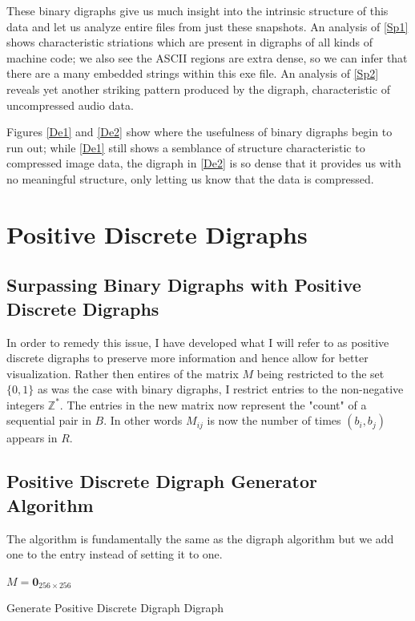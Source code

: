 \documentclass[12pt,a4paper]{article}
\begin{document}
These binary digraphs give us much insight into the intrinsic structure of this data and let us analyze entire files from just these snapshots. An analysis of \ref{Sp1} shows characteristic striations which are present in digraphs of all kinds of machine code; we also see the ASCII regions are extra dense, so we can infer that there are a many embedded strings within this exe file. An analysis of \ref{Sp2} reveals yet another striking pattern produced by the digraph, characteristic of uncompressed audio data. 

Figures \ref{De1} and \ref{De2} show where the usefulness of binary digraphs begin to run out; while \ref{De1} still shows a semblance of structure characteristic to compressed image data, the digraph in \ref{De2} is so dense that it provides us with no meaningful structure, only letting us know that the data is compressed. 

\section{Positive Discrete Digraphs}
\subsection{Surpassing Binary Digraphs with Positive Discrete Digraphs}
In order to remedy this issue, I have developed what I will refer to as positive discrete digraphs to preserve more information and hence allow for better visualization. Rather then entires of the matrix $M$ being restricted to the set $\{0, 1\}$ as was the case with binary digraphs, I restrict entries to the non-negative integers $\mathbb{Z}^{\ast}$. The entries in the new matrix now represent the "count" of a sequential pair in $B$. In other words $M_{ij}$ is now the number of times $(b_i, b_j)$ appears in $R$.
\subsection{Positive Discrete Digraph Generator Algorithm}
The algorithm is fundamentally the same as the digraph algorithm  but we add one to the entry instead of setting it to one. 
\begin{algorithm}
\DontPrintSemicolon
{}
\BlankLine
$M = \textbf{0}_{256\times256}$\;
\caption{Generate Positive Discrete Digraph Digraph}
\end{algorithm}
\end{document}
